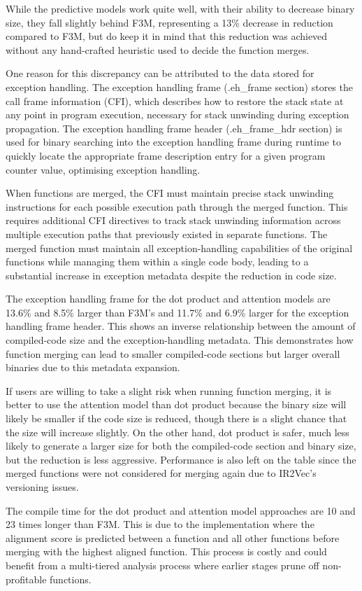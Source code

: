 While the predictive models work quite well, with their ability to decrease binary size, they fall slightly behind F3M, representing a 13\% decrease in reduction compared to F3M, but do keep it in mind that this reduction was achieved without any hand-crafted heuristic used to decide the function merges.

One reason for this discrepancy can be attributed to the data stored for exception handling. The exception handling frame (.eh\_frame section) stores the call frame information (CFI), which describes how to restore the stack state at any point in program execution, necessary for stack unwinding during exception propagation. The exception handling frame header (.eh\_frame\_hdr section) is used for binary searching into the exception handling frame during runtime to quickly locate the appropriate frame description entry for a given program counter value, optimising exception handling.

When functions are merged, the CFI must maintain precise stack unwinding instructions for each possible execution path through the merged function. This requires additional CFI directives to track stack unwinding information across multiple execution paths that previously existed in separate functions. The merged function must maintain all exception-handling capabilities of the original functions while managing them within a single code body, leading to a substantial increase in exception metadata despite the reduction in code size.

The exception handling frame for the dot product and attention models are 13.6\% and 8.5\% larger than F3M's and 11.7\% and 6.9\% larger for the exception handling frame header. This shows an inverse relationship between the amount of compiled-code size and the exception-handling metadata. This demonstrates how function merging can lead to smaller compiled-code sections but larger overall binaries due to this metadata expansion.

If users are willing to take a slight risk when running function merging, it is better to use the attention model than dot product because the binary size will likely be smaller if the code size is reduced, though there is a slight chance that the size will increase slightly. On the other hand, dot product is safer, much less likely to generate a larger size for both the compiled-code section and binary size, but the reduction is less aggressive. Performance is also left on the table since the merged functions were not considered for merging again due to IR2Vec's versioning issues. 

The compile time for the dot product and attention model approaches are 10 and 23 times longer than F3M. This is due to the implementation where the alignment score is predicted between a function and all other functions before merging with the highest aligned function. This process is costly and could benefit from a multi-tiered analysis process where earlier stages prune off non-profitable functions.